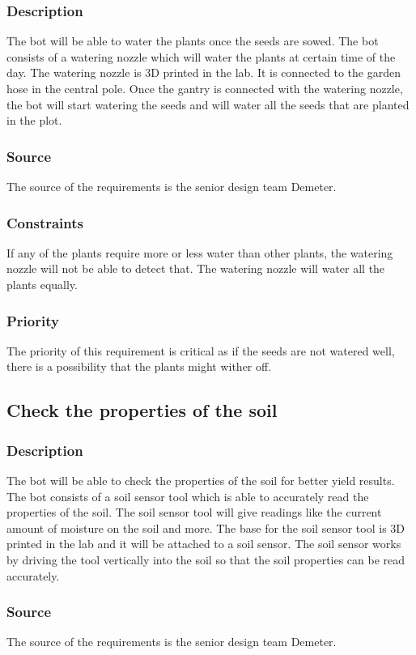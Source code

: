 \subsubsection{Description}
The bot will be able to water the plants once the seeds are sowed. The bot consists of a watering nozzle which will water the plants at certain time of the day. The watering nozzle is 3D printed in the lab. It is connected to the garden hose in the central pole. Once the gantry is connected with the watering nozzle, the bot will start watering the seeds and will water all the seeds that are planted in the plot.
\subsubsection{Source}
The source of the requirements is the senior design team Demeter.
\subsubsection{Constraints}
If any of the plants require more or less water than other plants, the watering nozzle will not be able to detect that. The watering nozzle will water all the plants equally.
\subsubsection{Priority}
The priority of this requirement is critical as if the seeds are not watered well, there is a possibility that the plants might wither off.

\subsection{Check the properties of the soil}
\subsubsection{Description}
The bot will be able to check the properties of the soil for better yield results. The bot consists of a soil sensor tool which is able to accurately read the properties of the soil. The soil sensor tool will give readings like the current amount of moisture on the soil and more. The base for the soil sensor tool is 3D printed in the lab and it will be attached to a soil sensor. The soil sensor works by driving the tool vertically into the soil so that the soil properties can be read accurately.
\subsubsection{Source}
The source of the requirements is the senior design team Demeter.

